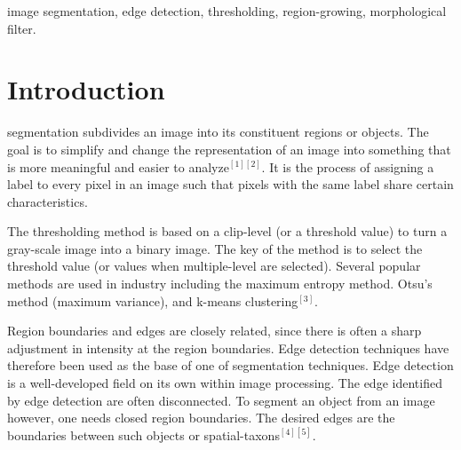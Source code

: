 \documentclass[journal]{IEEEtran}
\begin{document}
\begin{IEEEkeywords}
image segmentation, edge detection, thresholding, region-growing, morphological filter.
\end{IEEEkeywords}






%
\IEEEpeerreviewmaketitle



\section{Introduction}
%
%
%
%
 segmentation subdivides an image into its constituent regions or objects. The goal is to simplify and change the representation of an image into something that is more meaningful and easier to analyze$ ^{[1][2]} $. It is the process of assigning a label to every pixel in an image such that pixels with the same label share certain characteristics.

The thresholding method is based on a clip-level (or a threshold value) to turn a gray-scale image into a binary image. The key of the method is to select the threshold value (or values when multiple-level are selected). Several popular methods are used in industry including the maximum entropy method. Otsu's method (maximum variance), and k-means clustering$ ^{[3]} $.

Region boundaries and edges are closely related, since there is often a sharp adjustment in intensity at the region boundaries. Edge detection techniques have therefore been used as the base of one of segmentation techniques. Edge detection is a well-developed field on its own within image processing. The edge identified by edge detection are often disconnected. To segment an object from an image however, one needs closed region boundaries. The desired edges are the boundaries between such objects or spatial-taxons$ ^{[4][5]} $.
\end{document}
